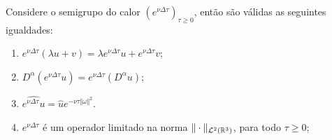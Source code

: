 \begin{pbox} \label{thm:propriedades-semi-grupo-calor}
    Considere o semigrupo do calor $(e^{\nu\Delta\tau})_{\tau \geqslant 0}$, então são válidas as seguintes igualdades:
    \begin{enumerate}[leftmargin=*, label=\textbf{(\alph*)}]
        \item $e^{\nu\Delta\tau}(\lambda u + v) = \lambda e^{\nu\Delta\tau} u + e^{\nu\Delta\tau} v$;
        \item $D^\alpha (e^{\nu\Delta\tau} u) = e^{\nu\Delta\tau} (D^\alpha u)$;
        \item $\widehat{e^{\nu\Delta \tau} u} = \hat u e^{-\nu \tau \Vert \omega \Vert^2}$.
        \item $e^{\nu\Delta \tau}$ é um operador limitado na norma $\Vert  \cdot\Vert_{\mathcal{L}^2(\mathbb{R}^3)}$, para todo $\tau \geqslant 0$;
    \end{enumerate}
\end{pbox} 
